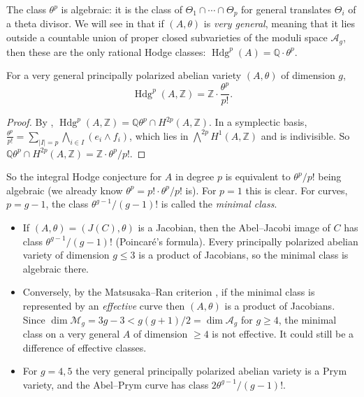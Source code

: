 \documentclass[12pt]{amsart}
\newcommand{\Q}{\mathbb{Q}}
\newcommand{\Z}{\mathbb{Z}}
\DeclareMathOperator{\Hdg}{Hdg}
\newcommand{\cA}{\mathcal{A}}
\let\oldbigwedge\bigwedge
\renewcommand{\bigwedge}{\mathop{\textstyle\oldbigwedge}\nolimits}
\theoremstyle{definition}
\theoremstyle{remark}
\numberwithin{equation}{section}
\begin{document}
The class $\theta^p$ is algebraic: it is the class of
$\Theta_1 \cap \cdots \cap \Theta_p$ for general translates $\Theta_i$ of a
theta divisor. We will see in  that if $(A, \theta)$ is
\emph{very general}, meaning that it lies outside a countable union of proper
closed subvarieties of the moduli space $\cA_g$, then these are the only
rational Hodge classes: $\Hdg^p(A) = \Q \cdot \theta^p$.

\begin{proposition}\label{prop:integral-AV}
    For a very general principally polarized abelian variety $(A, \theta)$ of
    dimension $g$,
    \begin{equation*}
        \Hdg^p(A, \Z) = \Z \cdot \frac{\theta^p}{p!}.
    \end{equation*}
\end{proposition}
\begin{proof}
    By ,
    $\Hdg^p(A, \Z) = \Q\theta^p \cap H^{2p}(A, \Z)$. In a symplectic basis,
    $\frac{\theta^p}{p!} = \sum_{|I| = p} \bigwedge_{i \in I}(e_i \wedge f_i)$,
    which lies in $\bigwedge^{2p} H^1(A, \Z)$ and is indivisible. So
    $\Q\theta^p \cap H^{2p}(A, \Z) = \Z \cdot \theta^p/p!$.
\end{proof}

So the integral Hodge conjecture for $A$ in degree $p$ is equivalent to
$\theta^p/p!$ being algebraic (we already know $\theta^p = p! \cdot
\theta^p/p!$ is). For $p = 1$ this is clear. For curves, $p = g - 1$, the class
$\theta^{g-1}/(g-1)!$ is called the \emph{minimal class}.
\begin{itemize}
    \item If $(A, \theta) = (J(C), \theta)$ is a Jacobian, then the
    Abel--Jacobi image of $C$ has class $\theta^{g-1}/(g-1)!$ (Poincar\'e's
    formula). Every principally polarized abelian variety of dimension
    $g \leq 3$ is a product of Jacobians, so the minimal class is algebraic
    there.
    \item Conversely, by the Matsusaka--Ran criterion
    \cite{Matsusaka59, Ran81}, if the minimal class is represented by an
    \emph{effective} curve then $(A, \theta)$ is a product of Jacobians. Since
    $\dim \mathcal{M}_g = 3g - 3 < g(g+1)/2 = \dim \cA_g$ for $g \geq 4$, the
    minimal class on a very general $A$ of dimension $\geq 4$ is not effective.
    It could still be a difference of effective classes.
    \item For $g = 4, 5$ the very general principally polarized abelian variety
    is a Prym variety, and the Abel--Prym curve has class
    $2\theta^{g-1}/(g-1)!$.
\end{itemize}
\end{document}
